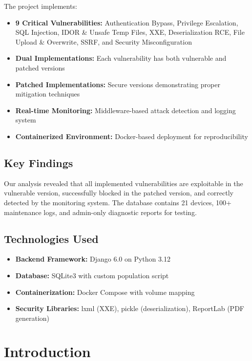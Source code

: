 \documentclass[12pt,a4paper]{article}
\begin{document}
The project implements:
\begin{itemize}[leftmargin=*]
    \item \textbf{9 Critical Vulnerabilities:} Authentication Bypass, Privilege Escalation, SQL Injection, IDOR \& Unsafe Temp Files, XXE, Deserialization RCE, File Upload \& Overwrite, SSRF, and Security Misconfiguration
    \item \textbf{Dual Implementations:} Each vulnerability has both vulnerable and patched versions
    \item \textbf{Patched Implementations:} Secure versions demonstrating proper mitigation techniques
    \item \textbf{Real-time Monitoring:} Middleware-based attack detection and logging system
    \item \textbf{Containerized Environment:} Docker-based deployment for reproducibility
\end{itemize}

\subsection{Key Findings}

Our analysis revealed that all implemented vulnerabilities are exploitable in the vulnerable version, successfully blocked in the patched version, and correctly detected by the monitoring system. The database contains 21 devices, 100+ maintenance logs, and admin-only diagnostic reports for testing.

\subsection{Technologies Used}

\begin{itemize}[leftmargin=*]
    \item \textbf{Backend Framework:} Django 6.0 on Python 3.12
    \item \textbf{Database:} SQLite3 with custom population script
    \item \textbf{Containerization:} Docker Compose with volume mapping
    \item \textbf{Security Libraries:} lxml (XXE), pickle (deserialization), ReportLab (PDF generation)
\end{itemize}

\newpage

\section{Introduction}
\end{document}

